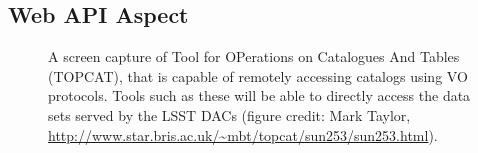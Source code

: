 \subsection{Web API Aspect\label{sec:apis}}

\begin{figure}
	\centering
	\caption{A screen capture of Tool for OPerations on Catalogues And Tables (TOPCAT), that is capable of remotely accessing catalogs using VO protocols. Tools such as these will be able to directly access the data sets served by the LSST DACs (figure credit: Mark Taylor, \url{http://www.star.bris.ac.uk/~mbt/topcat/sun253/sun253.html}).
		\label{fig:toolsTOPCAT}}
\end{figure}

